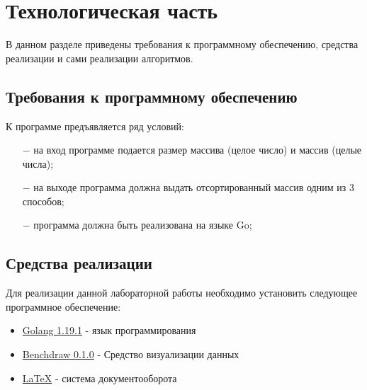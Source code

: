 \chapter{Технологическая часть}
В данном разделе приведены требования к программному обеспечению, средства реализации и сами реализации алгоритмов.

\section{Требования к программному обеспечению}
К программе предъявляется ряд условий:
\begin{itemize}
    \item[$-$] на вход программе подается размер массива (целое число) и массив (целые числа);
    \item[$-$] на выходе программа должна выдать отсортированный массив одним из 3 способов;
    \item[$-$] программа должна быть реализована на языке Go;
\end{itemize}

\section{Средства реализации}
Для реализации данной лабораторной работы необходимо установить следующее программное обеспечение:
\begin{itemize}
    \item \href{https://go.dev/}{Golang 1.19.1} - язык программирования
    \item \href{https://github.com/cep21/benchdraw}{Benchdraw 0.1.0} - Средство визуализации данных
    \item \href{https://www.latex-project.org/}{LaTeX} - система документооборота
\end{itemize}
\newpage

